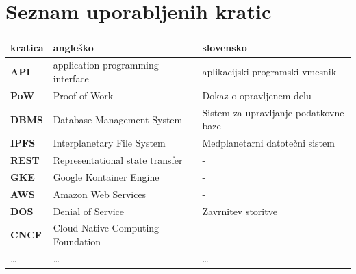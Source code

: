 \documentclass[a4paper, 12pt]{book}
\newcommand{\clearemptydoublepage}{\newpage{\pagestyle{empty}\cleardoublepage}}
\begin{document}
\clearemptydoublepage


\pagestyle{empty}
\def\thepage{}%
\tableofcontents{}


\clearemptydoublepage


\chapter*{Seznam uporabljenih kratic}  %

\noindent\begin{tabular}{p{}|p{}|p{}}    %
  {\bf kratica} & {\bf angleško}                             & {\bf slovensko} \\ \hline
  {\bf API}      & application programming interface & aplikacijski programski vmesnik \\
  {\bf PoW} & Proof-of-Work & Dokaz o opravljenem delu \\
  {\bf DBMS}   & Database Management System & Sistem za upravljanje podatkovne baze \\
  {\bf IPFS} & Interplanetary File System & Medplanetarni datotečni sistem \\
  {\bf REST} & Representational state transfer & - \\
  {\bf GKE} & Google Kontainer Engine & - \\
  {\bf AWS} & Amazon Web Services & - \\
  {\bf DOS} & Denial of Service & Zavrnitev storitve \\
  {\bf CNCF} & Cloud Native Computing Foundation & - \\
  \dots & \dots & \dots \\
\end{tabular}
\end{document}
